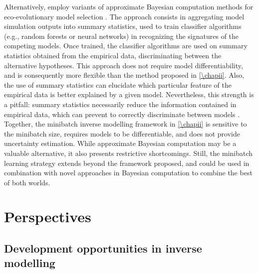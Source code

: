 % 
Alternatively, \cite{Sukumaran2016,Skeels2019,Skeels2022} employ variants of approximate Bayesian computation methods for eco-evolutionary model selection \citep{Csillery2010}. The approach consists in aggregating model simulation outputs into summary statistics, used to train classifier algorithms (e.g., random forests or neural networks) in recognizing the signatures of the competing models. Once trained, the classifier algorithms are used on summary statistics obtained from the empirical data, discriminating between the alternative hypotheses. 
% 
This approach does not require model differentiability, and is consequently more flexible than the method proposed in \cref{\chapii}. Also, the use of summary statistics can elucidate which particular feature of the empirical data is better explained by a given model. 
% 
Nevertheless, this strength is a pitfall: summary statistics necessarily reduce the information contained in empirical data, which can prevent to correctly discriminate between models \citep{Csillery2010}.
% 
Together, the minibatch inverse modelling framework in \cref{\chapii} is sensitive to the minibatch size, requires models to be differentiable, and does not provide uncertainty estimation. While approximate Bayesian computation may be a valuable alternative, it also presents restrictive shortcomings. Still, the minibatch learning strategy extends beyond the framework proposed, and could be used in combination with novel approaches in Bayesian computation to combine the best of both worlds.

\section{Perspectives}

\subsection{Development opportunities in inverse modelling}

